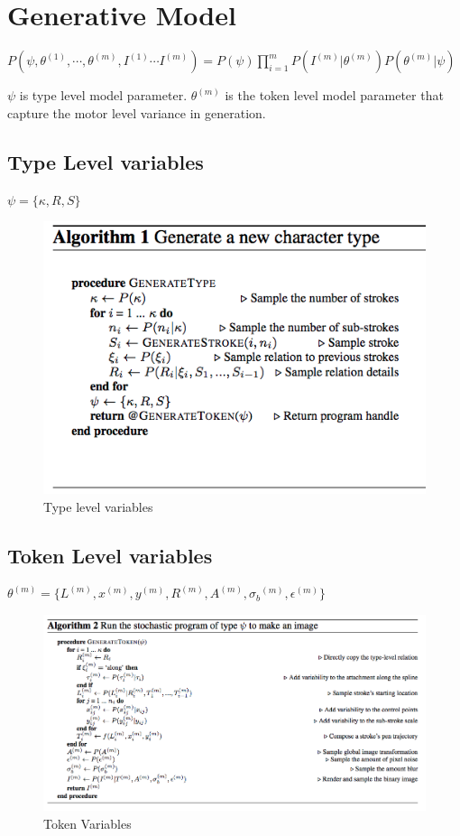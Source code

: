 \documentclass[11pt]{article}
\begin{document}
\section{Generative Model}
\label{sec-7}

$P(\psi, \theta^{(1)}, \cdots, \theta^{(m)}, I^{(1)}\cdots I^{(m)}) = P(\psi)\prod_{i=1}^{m}P(I^{(m)}|\theta^{(m)})P(\theta^{(m)}|\psi)$

$\psi$ is type level model parameter.  
$\theta^{(m)}$ is the token level model parameter that capture the motor level variance in generation.

\subsection{Type Level variables}
\label{sec-7-1}
$\psi=\{\kappa, R, S\}$
\begin{figure}[htb]
\centering
\includegraphics[width=.9\linewidth]{./md_slides/_images/bpl_typevars.png}
\caption{Type level variables}
\end{figure}

\subsection{Token Level variables}
\label{sec-7-2}
$\theta^{(m)} = \{L^{(m)}, x^{(m)}, y^{(m)}, R^{(m)}, A^{(m)}, {\sigma_b}^{(m)}, \epsilon^{(m)}\}$
\begin{figure}[htb]
\centering
\includegraphics[width=.9\linewidth]{./md_slides/_images/bpl_tokenvars.png}
\caption{Token Variables}
\end{figure}
\end{document}
